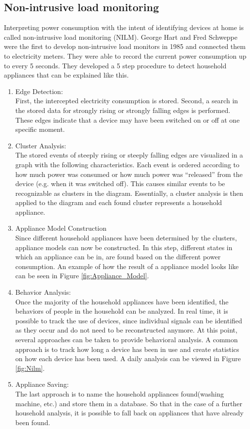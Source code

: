 \subsection{Non-intrusive load monitoring} 
\label{subsec:NILM_sec}
Interpreting power consumption with the intent of identifying devices at home is called non-intrusive load monitoring (NILM). George Hart and Fred Schweppe were the first to develop non-intrusive load monitors in 1985 and connected them to electricity meters. They were able to record the current power consumption up to every 5 seconds. They developed a 5 step procedure to detect household appliances that can be explained like this.
\begin{enumerate}
\item Edge Detection:\\
First, the intercepted electricity consumption is stored. Second, a search in the stored data for strongly rising or strongly falling edges is performed. These edges indicate that a device may have been switched on or off at one specific moment.
\item Cluster Analysis:\\ 
The stored events of steeply rising or steeply falling edges are visualized in a graph with the following characteristics. Each event is ordered according to how much power was consumed or how much power was 	``released'' from the device (e.g. when it was switched off). This causes similar events to be recognizable as clusters in the diagram.
Essentially, a cluster analysis is then applied to the diagram and each found cluster represents a household appliance.
\item Appliance Model Construction\\
Since different household appliances have been determined by the clusters, appliance models can now be constructed. In this step, different states in which an appliance can be in, are found based on the different power consumption. An example of how the result of a appliance model looks like can be seen in Figure \ref{fig:Appliance_Model}.
\item Behavior Analysis:\\
Once the majority of the household appliances have been identified, the behaviors of people in the household can be analyzed. In real time, it is possible to track the use of devices, since individual signals can be identified as they occur and do not need to be reconstructed anymore.
At this point, several approaches can be taken to provide behavioral analysis. A common approach is to track how long a device has been in use and create statistics on how each device has been used. A daily analysis can be viewed in Figure \ref{fig:Nilm}.
\item Appliance Saving:\\
The last approach is to name the household appliances found(washing machine, etc.) and store them in a database. So that in the case of a further household analysis, it is possible to fall back on appliances that have already been found.
\end{enumerate}
